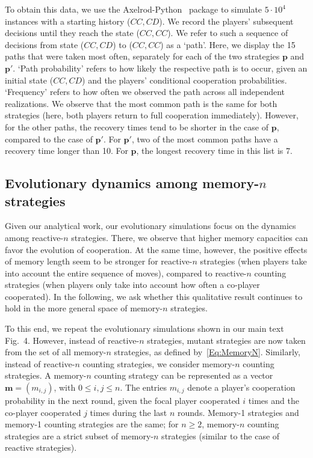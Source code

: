 \documentclass[9pt,twoside,lineno]{pnas-new}
\theoremstyle{plainCl1}
\theoremstyle{plainCl2}
\begin{document}
\begin{table}[t]
{{    To obtain this data, we use the Axelrod-Python~\cite{AxelrodPython} package to simulate $5\!\cdot\!10^4$ instances with a starting history ($CC,CD$). 
    We record the players' subsequent decisions until they reach the state ($CC,CC$). 
    We refer to such a sequence of decisions from state ($CC,CD$) to ($CC,CC$) as a `path'. 
    Here, we display the 15 paths that were taken most often, separately for each of the two strategies $\mathbf{p}$ and $\mathbf{p'}$. 
    `Path probability' refers to how likely the respective path is to occur, given an initial state ($CC,CD$) and the players' conditional cooperation probabilities. 
    `Frequency' refers to how often we observed the path across all independent realizations. 
    We observe that the most common path is the same for both strategies (here, both players return to full cooperation immediately). 
    However, for the other paths, the recovery times tend to be shorter in the case of \(\mathbf{p}\), compared to the case of \(\mathbf{p'}\).
    For \(\mathbf{p'}\), two of the most common paths have a recovery time longer than 10. 
    For \(\mathbf{p}\), the longest recovery time in this list is 7.}}
    \label{Tab:Recovery}
\end{table}




\subsection{Evolutionary dynamics among memory-$n$ strategies}

Given our analytical work, our evolutionary simulations focus on the dynamics among reactive-$n$ strategies. 
There, we observe that higher memory capacities can favor the evolution of cooperation. 
At the same time, however, the positive effects of memory length seem to be stronger for reactive-$n$ strategies (when players take into account the entire sequence of moves), compared to reactive-$n$ counting strategies (when players only take into account how often a co-player cooperated).
In the following, we ask whether this qualitative result continues to hold in the more general space of memory-$n$ strategies. 

To this end, we repeat the evolutionary simulations shown in our main text Fig.~4. 
However, instead of reactive-$n$ strategies, mutant strategies are now taken from the set of all memory-$n$ strategies, as defined by~\eqref{Eq:MemoryN}. 
Similarly, instead of reactive-$n$ counting strategies, we consider memory-$n$ counting strategies. 
A memory-$n$ counting strategy can be represented as a vector $\mathbf{m} = (m_{i,j})$, with $0 \leq i, j \leq n$. 
The entries $m_{i,j}$ denote a player's cooperation probability in the next round, given the focal player cooperated $i$ times and the co-player cooperated $j$ times during the last $n$ rounds.
Memory-1 strategies and memory-1 counting strategies are the same; for $n\!\ge\!2$, memory-$n$ counting strategies are a strict subset of memory-$n$ strategies (similar to the case of reactive strategies). 
\end{document}
